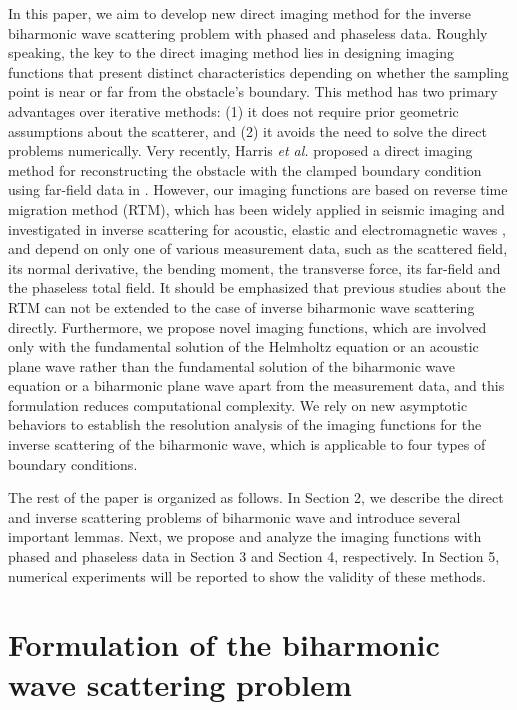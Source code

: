 \documentclass[10pt,a4paper]{article}
\numberwithin{equation}{section}
\begin{document}
In this paper, we aim to develop new direct imaging method for the inverse biharmonic wave scattering problem with phased and phaseless data. Roughly speaking, the key to the direct imaging method lies in designing imaging functions that present distinct characteristics depending on whether the sampling point is near or far from the obstacle's boundary.  This method has two primary advantages over iterative methods: (1) it does not require prior geometric assumptions about the scatterer, and (2) it avoids the need to solve the direct problems numerically. Very recently, Harris \emph{et al.} proposed a direct imaging method for reconstructing the obstacle with the clamped boundary condition using far-field data in  \cite{harris_direct_2025}. However, our imaging functions are based on reverse time migration method (RTM), which has been widely applied in seismic imaging and investigated in inverse scattering for acoustic, elastic and electromagnetic waves  \cite{chen_reverse_2013,chen_reverse_2015,chen_reverse_2013b}, and depend on only one of various measurement data, such as the scattered field, its normal derivative, the bending moment, the transverse force, its far-field and the phaseless total field. It should be emphasized that previous studies about the RTM can not be extended to the case of inverse biharmonic wave scattering directly. Furthermore, we propose novel imaging functions, which are involved only with the fundamental solution of the Helmholtz equation or an acoustic plane wave rather than the fundamental solution of the biharmonic wave equation or a biharmonic plane wave apart from the measurement data, and this formulation reduces computational complexity.  We rely on new asymptotic behaviors to establish the resolution analysis of the imaging functions for the inverse scattering of the biharmonic wave, which is applicable to four types of boundary conditions.


The rest of the paper is organized as follows. In Section 2, we describe the direct and inverse scattering problems of biharmonic wave and introduce several important lemmas.  Next, we propose and analyze the imaging functions with phased and phaseless data in Section 3 and Section 4, respectively. In Section 5, numerical experiments will  be reported to show the validity of these methods.

\section{Formulation of the biharmonic wave scattering problem}
\label{sec:formulation}
\end{document}
